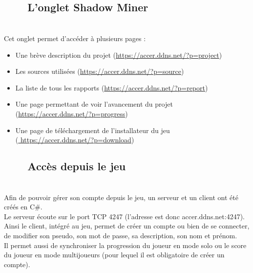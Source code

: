 \documentclass[titlepage, 13px, a4paper]{report}
\begin{document}
\subsection[L’onglet Shadow Miner]{~~~~L’onglet Shadow Miner}
\paragraph{} \hspace{0pt} \\
Cet onglet permet d’accéder à plusieurs pages : \\
{\begin{itemize}
	\item Une brève description du projet (\url{https://accer.ddns.net/?p=project})
	\item Les sources utilisées (\url{https://accer.ddns.net/?p=source})
	\item La liste de tous les rapports (\url{https://accer.ddns.net/?p=report})
	\item Une page permettant de voir l’avancement du projet \\
		(\url{https://accer.ddns.net/?p=progress})
	\item Une page de téléchargement de l’installateur du jeu \\
		(\url{ https://accer.ddns.net/?p=download}) \\
\end{itemize}}

\subsection[Accès depuis le jeu]{~~~~Accès depuis le jeu}
\paragraph{} \hspace{0pt} \\
Afin de pouvoir gérer son compte depuis le jeu, un serveur et un client ont été créés en C\#. \\
Le serveur écoute sur le port TCP 4247 (l’adresse est donc accer.ddns.net:4247). Ainsi le client, 
intégré au jeu, permet de créer un compte ou bien de se connecter, de modifier son pseudo, 
son mot de passe, sa description, son nom et prénom. \\
Il permet aussi de synchroniser la progression du joueur en mode solo ou le score du joueur 
en mode multijoueurs (pour lequel il est obligatoire de créer un compte). \\
\end{document}
